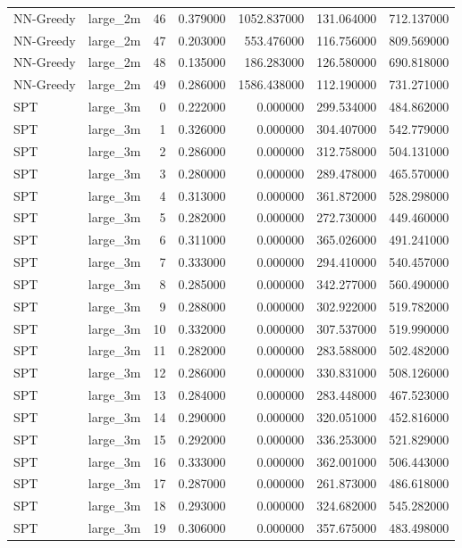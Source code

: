 \begin{tabular}{llrrrrr}
NN-Greedy & large_2m & 46 & 0.379000 & 1052.837000 & 131.064000 & 712.137000 \\
NN-Greedy & large_2m & 47 & 0.203000 & 553.476000 & 116.756000 & 809.569000 \\
NN-Greedy & large_2m & 48 & 0.135000 & 186.283000 & 126.580000 & 690.818000 \\
NN-Greedy & large_2m & 49 & 0.286000 & 1586.438000 & 112.190000 & 731.271000 \\
SPT & large_3m & 0 & 0.222000 & 0.000000 & 299.534000 & 484.862000 \\
SPT & large_3m & 1 & 0.326000 & 0.000000 & 304.407000 & 542.779000 \\
SPT & large_3m & 2 & 0.286000 & 0.000000 & 312.758000 & 504.131000 \\
SPT & large_3m & 3 & 0.280000 & 0.000000 & 289.478000 & 465.570000 \\
SPT & large_3m & 4 & 0.313000 & 0.000000 & 361.872000 & 528.298000 \\
SPT & large_3m & 5 & 0.282000 & 0.000000 & 272.730000 & 449.460000 \\
SPT & large_3m & 6 & 0.311000 & 0.000000 & 365.026000 & 491.241000 \\
SPT & large_3m & 7 & 0.333000 & 0.000000 & 294.410000 & 540.457000 \\
SPT & large_3m & 8 & 0.285000 & 0.000000 & 342.277000 & 560.490000 \\
SPT & large_3m & 9 & 0.288000 & 0.000000 & 302.922000 & 519.782000 \\
SPT & large_3m & 10 & 0.332000 & 0.000000 & 307.537000 & 519.990000 \\
SPT & large_3m & 11 & 0.282000 & 0.000000 & 283.588000 & 502.482000 \\
SPT & large_3m & 12 & 0.286000 & 0.000000 & 330.831000 & 508.126000 \\
SPT & large_3m & 13 & 0.284000 & 0.000000 & 283.448000 & 467.523000 \\
SPT & large_3m & 14 & 0.290000 & 0.000000 & 320.051000 & 452.816000 \\
SPT & large_3m & 15 & 0.292000 & 0.000000 & 336.253000 & 521.829000 \\
SPT & large_3m & 16 & 0.333000 & 0.000000 & 362.001000 & 506.443000 \\
SPT & large_3m & 17 & 0.287000 & 0.000000 & 261.873000 & 486.618000 \\
SPT & large_3m & 18 & 0.293000 & 0.000000 & 324.682000 & 545.282000 \\
SPT & large_3m & 19 & 0.306000 & 0.000000 & 357.675000 & 483.498000 \\

\end{tabular}
